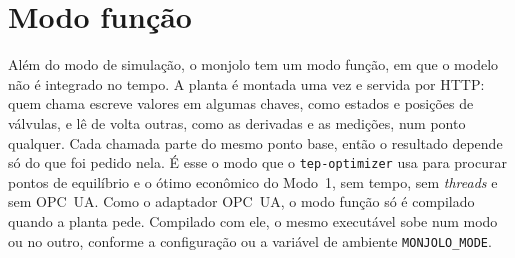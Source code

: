 \section{Modo função}
\label{apC:funcao}

Além do modo de simulação, o monjolo tem um modo função, em que o modelo não é integrado no tempo. A planta é montada uma vez e servida por HTTP: quem chama escreve valores em algumas chaves, como estados e posições de válvulas, e lê de volta outras, como as derivadas e as medições, num ponto qualquer. Cada chamada parte do mesmo ponto base, então o resultado depende só do que foi pedido nela. É esse o modo que o \texttt{tep-optimizer} usa para procurar pontos de equilíbrio e o ótimo econômico do Modo~1, sem tempo, sem \textit{threads} e sem OPC~UA. Como o adaptador OPC~UA, o modo função só é compilado quando a planta pede. Compilado com ele, o mesmo executável sobe num modo ou no outro, conforme a configuração ou a variável de ambiente \texttt{MONJOLO\_MODE}.
